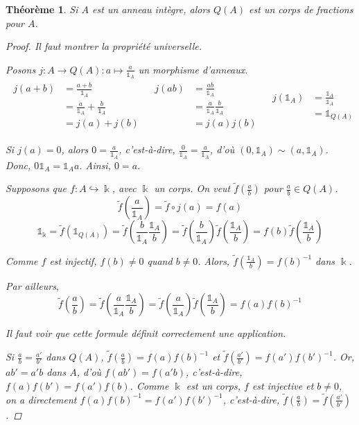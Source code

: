 \documentclass{report}
\newtheorem*{thm}{Th\'eor\`eme}
\theoremstyle{definition}
\theoremstyle{remark}
\def\id{\mathds{1}}
\begin{document}
	\begin{thm}
		Si $A$ est un anneau int\`egre, alors $Q(A)$ est un corps de fractions pour $A$.
		\begin{proof}
			Il faut montrer la propri\'et\'e universelle.

			Posons $j : A\to Q(A) : a\mapsto\frac{a}{\id_A}$ un morphisme d'anneaux.
			\begin{align*}
				\begin{split}
					j(a+b)&= \frac{a+b}{\id_A}\\
					&= \frac{a}{\id_A}+\frac{b}{\id_A}\\
					&= j(a)+j(b)
				\end{split}
				&
				\begin{split}
					j(ab)&= \frac{ab}{\id_A}\\
					&= \frac{a}{\id_A}\frac{b}{\id_A}\\
					&= j(a)j(b)
				\end{split}
				&
				\begin{split}
					j(\id_A)&= \frac{\id_A}{\id_A}\\
					&= \id_{Q(A)}
				\end{split}
			\end{align*}

			Si $j(a)=0$, alors $0=\frac{a}{\id_A}$, c'est-\`a-dire, $\frac{0}{\id_A}=\frac{a}{\id_A}$, d'o\`u $(0,\id_A)\sim(a,\id_A)$. Donc, $0\id_A=\id_A a$. Ainsi, $0=a$.

			Supposons que $f:A\hookrightarrow\Bbbk$, avec $\Bbbk$ un corps. On veut $\widetilde{f}\left(\frac{a}{b}\right)$ pour $\frac{a}{b}\in Q(A)$.
			\[ \widetilde{f}\left(\frac{a}{\id_A}\right) = \widetilde{f}\circ j(a) = f(a) \]
			\[ \id_\Bbbk = \widetilde{f}\left(\id_{Q(A)}\right) = \widetilde{f}\left(\frac{b}{\id_A}\frac{\id_A}{b}\right) = \widetilde{f}\left(\frac{b}{\id_A}\right) \widetilde{f}\left(\frac{\id_A}{b}\right) = f(b)\widetilde{f}\left(\frac{\id_A}{b}\right) \]

			Comme $f$ est injectif, $f(b)\neq0$ quand $b\neq0$. Alors, $\widetilde{f}\left(\frac{\id_A}{b}\right)=f(b)^{-1}$ dans $\Bbbk$.

			Par ailleurs, \[ \widetilde{f}\left(\frac{a}{b}\right) = \widetilde{f}\left(\frac{a}{\id_A}\frac{\id_A}{b}\right) = \widetilde{f}\left(\frac{a}{\id_A}\right) \widetilde{f}\left(\frac{\id_A}{b}\right) = f(a)f(b)^{-1} \]

			Il faut voir que cette formule d\'efinit correctement une application.

			Si $\frac{a}{b}=\frac{a'}{b'}$ dans $Q(A)$, $\widetilde{f}\left(\frac{a}{b}\right) = f(a)f(b)^{-1}$ et $\widetilde{f}\left(\frac{a'}{b'}\right) = f(a')f(b')^{-1}$. Or, $ab'=a'b$ dans $A$, d'o\`u $f(ab') = f(a'b)$, c'est-\`a-dire, $f(a)f(b') = f(a')f(b)$. Comme $\Bbbk$ est un corps, $f$ est injective et $b\neq0$, on a directement $f(a)f(b)^{-1}=f(a')f(b')^{-1}$, c'est-\`a-dire, $\widetilde{f}\left(\frac{a}{b}\right) = \widetilde{f}\left(\frac{a'}{b'}\right)$.


\end{proof}
\end{thm}
\end{document}
